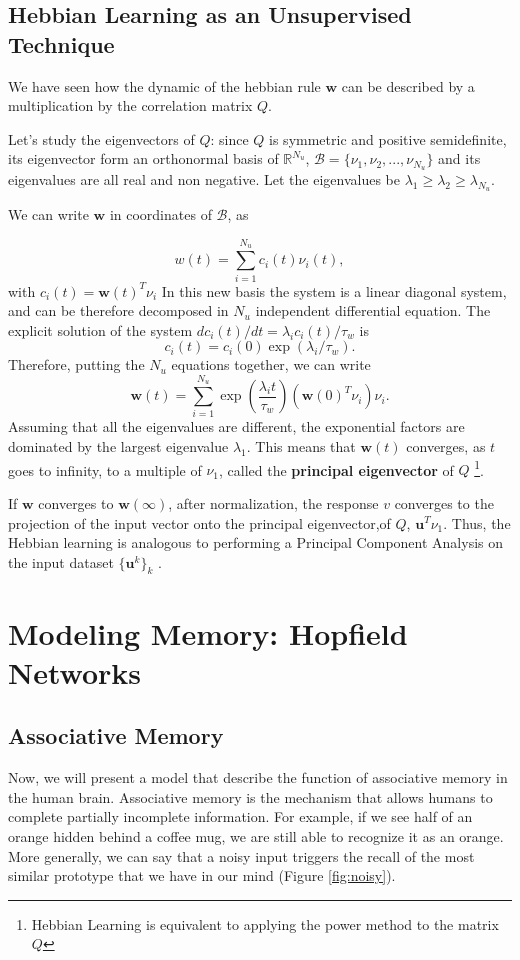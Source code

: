 \documentclass[oneside]{book}
\renewcommand{\u}{\mathbf{u}}
\newcommand{\w}{\mathbf{w}}
\newcommand{\R}{\mathbb{R}}
\theoremstyle{definition}
\theoremstyle{plain}
\begin{document}
\subsection{Hebbian Learning as an Unsupervised Technique}

We have seen how the dynamic of the hebbian rule $\w$ can be described by a multiplication by the correlation matrix $Q$. 

Let's study the eigenvectors of $Q$: since $Q$ is symmetric and positive semidefinite, its eigenvector form an orthonormal basis of $\R^{N_u}$, $\mathcal{B} =\{ \nu_1,\nu_2,...,\nu_{N_u}\}$ and its eigenvalues are all real and non negative.  Let the eigenvalues be $\lambda_1\geq \lambda_2\geq\lambda_{N_u}$.

We can write $\w$ in coordinates of $\mathcal{B}$, as 

\[w(t) = \sum_{i=1}^{N_u} c_i(t) \nu_i(t),
\]
with $c_i(t)=\w(t)^T\nu_i$
In this new basis the system is a linear diagonal system, and can be therefore decomposed in $N_u$ independent differential equation. The explicit solution of the system $d c_i(t)/dt = \lambda_i c_i(t)/\tau_w$ is
\[
    c_i(t)=c_i(0) \exp(\lambda_i/\tau_w).
\]
Therefore, putting the $N_u$ equations together, we can write
\begin{equation}
    \w(t) = \sum_{i=1}^{N_u} \exp\left( \frac{\lambda_i t}{\tau_w}\right) (\w(0)^T\nu_i)\nu_i .
\end{equation}
Assuming that all the eigenvalues are different, the exponential factors are dominated by the largest eigenvalue $\lambda_1$. This means that $\w(t)$ converges, as $t$ goes to infinity, to a multiple of  $\nu_1$, called the \textbf{principal eigenvector} of $Q$ \footnote{Hebbian Learning is equivalent to applying the power method to the matrix $Q$}.  

If $\w$ converges to $\w(\infty)$,  after normalization, the response $v$ converges to the projection of the input vector onto the principal eigenvector,of $Q$,  $\u^T \nu_1$. 
Thus, the Hebbian learning is analogous to performing a Principal Component Analysis on the input dataset $\{\u^k\}_{k}$ . 

\section{Modeling Memory: Hopfield Networks}
\subsection{Associative Memory}
Now, we will present a model that describe the function of associative memory in the human brain. Associative memory is the mechanism that allows humans to complete partially incomplete information. For example, if we see half of an orange  hidden behind a coffee mug, we are still able to recognize it as an orange. More generally, we can say that a noisy input triggers the recall of the most similar prototype that we have in our mind (Figure \ref{fig:noisy}).
\end{document}
